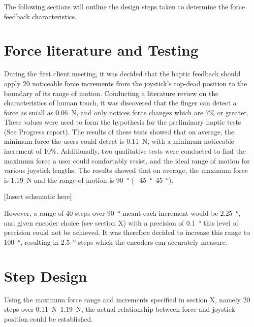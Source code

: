 
The following sections will outline the design steps taken to determine the force feedback characteristics.

\section{Force literature and Testing} %
\label{sec:force_literature_and_testing}

During the first client meeting, it was decided that the haptic feedback should apply 20 noticeable force increments from the joystick's top-dead position to the boundary of its range of motion. Conducting a literature review on the characteristics of human touch, it was discovered that the finger can detect a force as small as \SI{0.06}{\newton}, and only notices force changes which are 7\% or greater.
These values were used to form the hypothesis for the preliminary haptic tests (See Progress report).
The results of these tests showed that on average, the minimum force the users could detect is \SI{0.11}{\newton}, with a minimum noticeable increment of 10\%.
Additionally, two qualitative tests were conducted to find the maximum force a user could comfortably resist, and the ideal range of motion for various joystick lengths. The results showed that on average, the maximum force is \SI{1.19}{\newton} and the range of motion is \SI{90}{\degree} (\SIrange{-45}{45}{\degree}).

[Insert schematic here]

However, a range of 40 steps over \SI{90}{\degree} meant each increment would be \SI{2.25}{\degree}, and given encoder choice (see section X) with a precision of \SI{0.1}{\degree} this level of precision could not be achieved. It was therefore decided to increase this range to \SI{100}{\degree}, resulting in \SI{2.5}{\degree} steps which the encoders can accurately measure.


\section{Step Design} %
\label{sec:step_design}

Using the maximum force range and increments specified in section X, namely 20 steps over \SIrange{0.11}{1.19}{\newton}, the actual relationship between force and joystick position could be established.

